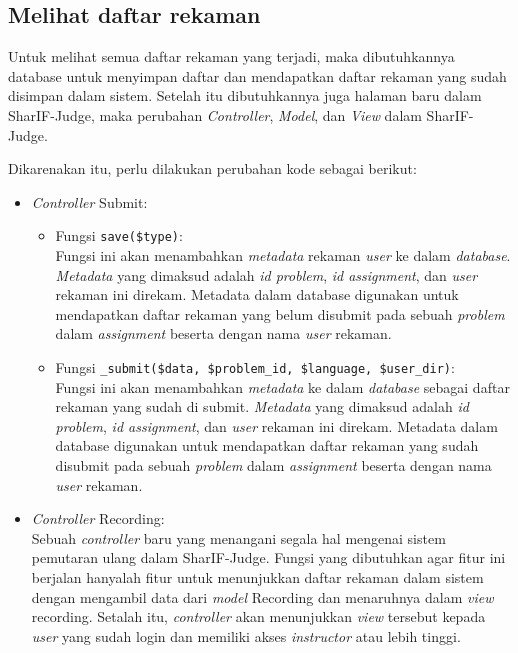 \subsection{Melihat daftar rekaman}
\label{sub:4:3:melihatdaftarrekaman}

Untuk melihat semua daftar rekaman yang terjadi, maka dibutuhkannya database untuk menyimpan daftar dan mendapatkan daftar rekaman yang sudah disimpan dalam sistem. Setelah itu dibutuhkannya juga halaman baru dalam SharIF-Judge, maka perubahan \textit{Controller}, \textit{Model}, dan \textit{View} dalam SharIF-Judge.

Dikarenakan itu, perlu dilakukan perubahan kode sebagai berikut:

\begin{itemize}
    \item \textit{Controller} Submit:
    \begin{itemize}
        \item Fungsi \verb|save($type)|: \\
        Fungsi ini akan menambahkan \textit{metadata} rekaman \textit{user} ke dalam \textit{database}. \textit{Metadata} yang dimaksud adalah \textit{id problem}, \textit{id assignment}, dan \textit{user} rekaman ini direkam. Metadata dalam database digunakan untuk mendapatkan daftar rekaman yang belum disubmit pada sebuah \textit{problem} dalam \textit{assignment} beserta dengan nama \textit{user} rekaman.
        \item Fungsi \verb|_submit($data, $problem_id, $language, $user_dir)|: \\
        Fungsi ini akan menambahkan \textit{metadata} ke dalam \textit{database} sebagai daftar rekaman yang sudah di submit. \textit{Metadata} yang dimaksud adalah \textit{id problem}, \textit{id assignment}, dan \textit{user} rekaman ini direkam. Metadata dalam database digunakan untuk mendapatkan daftar rekaman yang sudah disubmit pada sebuah \textit{problem} dalam \textit{assignment} beserta dengan nama \textit{user} rekaman.
    \end{itemize}
    \item \textit{Controller} Recording: \\
    Sebuah \textit{controller} baru yang menangani segala hal mengenai sistem pemutaran ulang dalam SharIF-Judge. Fungsi yang dibutuhkan agar fitur ini berjalan hanyalah fitur untuk menunjukkan daftar rekaman dalam sistem dengan mengambil data dari \textit{model} Recording dan menaruhnya dalam \textit{view} recording. Setalah itu, \textit{controller} akan menunjukkan \textit{view} tersebut kepada \textit{user} yang sudah login dan memiliki akses \textit{instructor} atau lebih tinggi.

\end{itemize}
